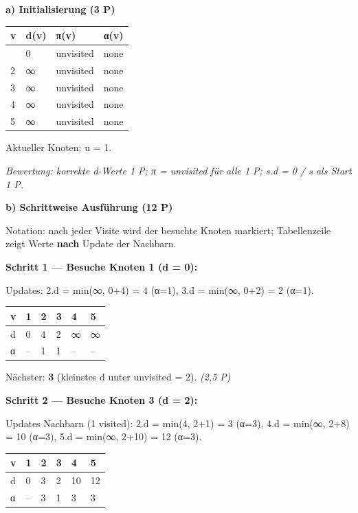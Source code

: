 \documentclass[11pt, a4paper]{article}
\begin{document}
\textbf{a) Initialisierung (3 P)}



{\small
\begin{tabularx}{\linewidth}{XXXX}
\hline
\rowcolor{tableheadbg}
{\color{white}\textbf{v}} & {\color{white}\textbf{d(v)}} & {\color{white}\textbf{π(v)}} & {\color{white}\textbf{α(v)}} \\[2pt]
\hline
\endhead
\hline
\endfoot
1 & 0 & unvisited & none \\
2 & ∞ & unvisited & none \\
3 & ∞ & unvisited & none \\
4 & ∞ & unvisited & none \\
5 & ∞ & unvisited & none \\
\end{tabularx}
}


Aktueller Knoten: u = 1.


\textit{Bewertung: korrekte d-Werte 1 P; π = unvisited für alle 1 P; s.d = 0 / s als Start 1 P.}


\textbf{b) Schrittweise Ausführung (12 P)}


Notation: nach jeder Visite wird der besuchte Knoten markiert; Tabellenzeile zeigt Werte \textbf{nach} Update der Nachbarn.


\textbf{Schritt 1 — Besuche Knoten 1 (d = 0):}

Updates: 2.d = min(∞, 0+4) = 4 (α=1), 3.d = min(∞, 0+2) = 2 (α=1).



{\small
\begin{tabularx}{\linewidth}{XXXXXX}
\hline
\rowcolor{tableheadbg}
{\color{white}\textbf{v}} & {\color{white}\textbf{1}} & {\color{white}\textbf{2}} & {\color{white}\textbf{3}} & {\color{white}\textbf{4}} & {\color{white}\textbf{5}} \\[2pt]
\hline
\endhead
\hline
\endfoot
d & 0 & 4 & 2 & ∞ & ∞ \\
α & – & 1 & 1 & – & – \\
\end{tabularx}
}


Nächster: \textbf{3} (kleinstes d unter unvisited = 2). \textit{(2,5 P)}


\textbf{Schritt 2 — Besuche Knoten 3 (d = 2):}

Updates Nachbarn (1 visited): 2.d = min(4, 2+1) = 3 (α=3), 4.d = min(∞, 2+8) = 10 (α=3), 5.d = min(∞, 2+10) = 12 (α=3).



{\small
\begin{tabularx}{\linewidth}{XXXXXX}
\hline
\rowcolor{tableheadbg}
{\color{white}\textbf{v}} & {\color{white}\textbf{1}} & {\color{white}\textbf{2}} & {\color{white}\textbf{3}} & {\color{white}\textbf{4}} & {\color{white}\textbf{5}} \\[2pt]
\hline
\endhead
\hline
\endfoot
d & 0 & 3 & 2 & 10 & 12 \\
α & – & 3 & 1 & 3 & 3 \\
\end{tabularx}
}
\end{document}
